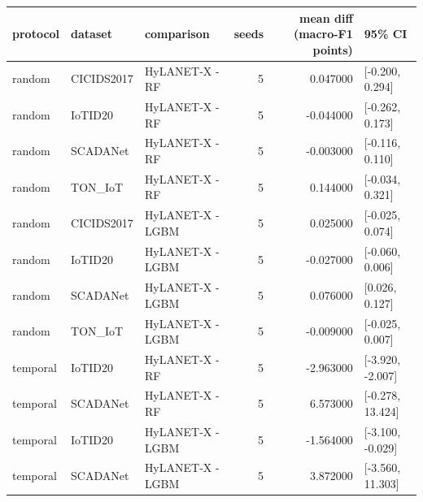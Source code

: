 \begin{tabular}{lllrrl}
\toprule
protocol & dataset & comparison & seeds & mean diff (macro-F1 points) & 95\% CI \\
\midrule
random & CICIDS2017 & HyLANET-X - RF & 5 & 0.047000 & [-0.200, 0.294] \\
random & IoTID20 & HyLANET-X - RF & 5 & -0.044000 & [-0.262, 0.173] \\
random & SCADANet & HyLANET-X - RF & 5 & -0.003000 & [-0.116, 0.110] \\
random & TON\_IoT & HyLANET-X - RF & 5 & 0.144000 & [-0.034, 0.321] \\
random & CICIDS2017 & HyLANET-X - LGBM & 5 & 0.025000 & [-0.025, 0.074] \\
random & IoTID20 & HyLANET-X - LGBM & 5 & -0.027000 & [-0.060, 0.006] \\
random & SCADANet & HyLANET-X - LGBM & 5 & 0.076000 & [0.026, 0.127] \\
random & TON\_IoT & HyLANET-X - LGBM & 5 & -0.009000 & [-0.025, 0.007] \\
temporal & IoTID20 & HyLANET-X - RF & 5 & -2.963000 & [-3.920, -2.007] \\
temporal & SCADANet & HyLANET-X - RF & 5 & 6.573000 & [-0.278, 13.424] \\
temporal & IoTID20 & HyLANET-X - LGBM & 5 & -1.564000 & [-3.100, -0.029] \\
temporal & SCADANet & HyLANET-X - LGBM & 5 & 3.872000 & [-3.560, 11.303] \\
\bottomrule
\end{tabular}
